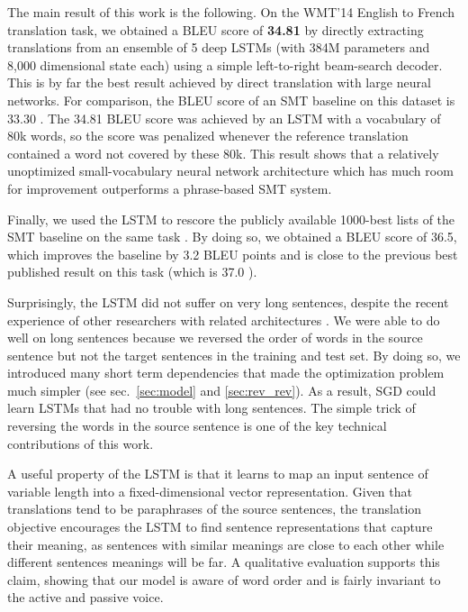 The main result of this work is the following.  On the WMT'14 English
to French translation task, we obtained a BLEU score of {\bf 34.81} by
directly extracting translations from an ensemble of 5 deep LSTMs
(with 384M parameters and 8,000 dimensional state each) using a simple left-to-right beam-search
decoder.  This is by far the best result achieved by direct
translation with large neural networks.  For comparison, the BLEU
score of an SMT baseline on
this dataset is 33.30 \cite{wmt14_en_fr}.  The
34.81 BLEU score was achieved by an LSTM with a vocabulary of 80k
words, so the score was penalized whenever the reference translation
contained a word not covered by these 80k.  This result shows that a
relatively unoptimized small-vocabulary neural network architecture which has much room
for improvement outperforms a phrase-based SMT system.

Finally, we used the LSTM to rescore the publicly available 1000-best
lists of the SMT baseline on the same task \cite{wmt14_en_fr}.  By
doing so, we obtained a BLEU score of 36.5, which improves the
baseline by 3.2 BLEU points and is close to the previous best published
result on this task (which is 37.0 \cite{durrani-EtAl:2014:W14-33}).

Surprisingly, the LSTM did not suffer on very long sentences, despite
the recent experience of other researchers with related architectures
\cite{curse}.  We were able to do well on long sentences because we
reversed the order of words in the source sentence but not the target
sentences in the training and test set. By doing so, we introduced
many short term dependencies that made the optimization problem much
simpler (see sec.~\ref{sec:model} and \ref{sec:rev_rev}).  As a result, SGD could learn
LSTMs that had no trouble with long sentences.  The simple trick of
reversing the words in the source sentence is one of the key technical
contributions of this work.
 
A useful property of the LSTM is that it learns to map an input
sentence of variable length into a fixed-dimensional vector
representation.  Given that translations tend to be paraphrases of the
source sentences, the translation objective encourages the LSTM to
find sentence representations that capture their meaning, as sentences
with similar meanings are close to each other while different
sentences meanings will be far. A qualitative evaluation supports
this claim, showing that our model is aware of word order and is
fairly invariant to the active and passive voice.

